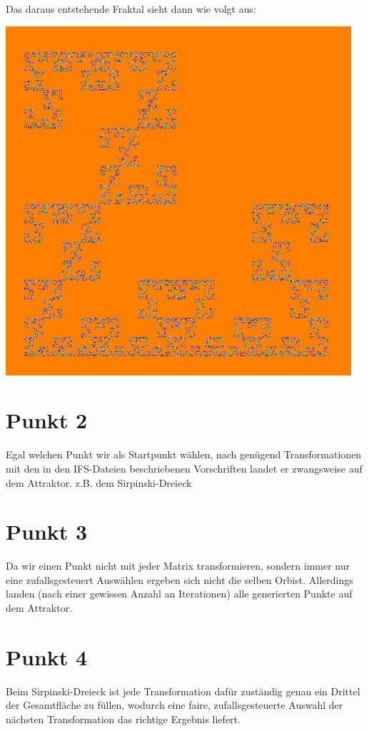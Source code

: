 \documentclass[10pt,a4paper]{article}
\begin{document}
Das daraus entstehende Fraktal sieht dann wie volgt aus:

\begin{center}
	\includegraphics[scale=0.5]{images/IFS-TEST.png}
	\label{fig:prim}
\end{center}

\section{Punkt 2}
Egal welchen Punkt wir als Startpunkt wählen, nach genügend Transformationen mit den in den IFS-Dateien beschriebenen Vorschriften landet er zwangsweise auf dem Attraktor. z.B. dem Sirpinski-Dreieck

\section{Punkt 3}
Da wir einen Punkt nicht mit jeder Matrix transformieren, sondern immer nur eine zufallsgesteuert Auswählen ergeben sich nicht die selben Orbist. Allerdings landen (nach einer gewissen Anzahl an Iterationen) alle generierten Punkte auf dem Attraktor.

\section{Punkt 4}
Beim Sirpinski-Dreieck ist jede Transformation dafür zuständig genau ein Drittel der Gesamtfläche zu füllen, wodurch eine faire, zufallsgesteuerte Auswahl der nächsten Transformation das richtige Ergebnis liefert. 
\end{document}

